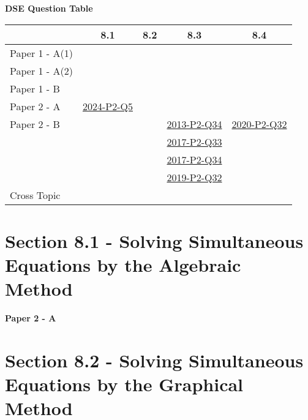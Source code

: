 \documentclass[12pt, a4paper]{article}
\begin{document}
\begin{absolutelynopagebreak}
\begin{center}
\textbf{DSE Question Table}
\end{center}
\begin{center}
\begin{tabular}{|l|c|c|c|c|}
\hline
        & 8.1 & 8.2 & 8.3 & 8.4 \\\hline
\hline
Paper 1 - A(1)&  &  &  &  \\
\hline
Paper 1 - A(2)&  &  &  &  \\
\hline
Paper 1 - B&  &  &  &  \\
\hline
\hline
Paper 2 - A& \hyperref[DSE2024-CoreP2-Q05]{2024-P2-Q5} &  &  &  \\
\hline
Paper 2 - B&  &  & \hyperref[DSE2013-CoreP2-Q34]{2013-P2-Q34} & \hyperref[DSE2020-CoreP2-Q32]{2020-P2-Q32} \\
&  &  & \hyperref[DSE2017-CoreP2-Q33]{2017-P2-Q33} &  \\
&  &  & \hyperref[DSE2017-CoreP2-Q34]{2017-P2-Q34} &  \\
&  &  & \hyperref[DSE2019-CoreP2-Q32]{2019-P2-Q32} &  \\
\hline
\hline
Cross Topic&  &  &  &  \\
\hline
\end{tabular}
\end{center}
\end{absolutelynopagebreak}




\section*{Section 8.1 - Solving Simultaneous Equations by the Algebraic Method  \NF}\label{section:4-8-1}

\textbf{Paper 2 - A}
\begin{enumx}[label=\arabic*.,start=1]
\item {}\label{DSE2024-CoreP2-Q05} 
\end{enumx}




\section*{Section 8.2 - Solving Simultaneous Equations by the Graphical Method \NF}\label{section:4-8-2}
\end{document}
